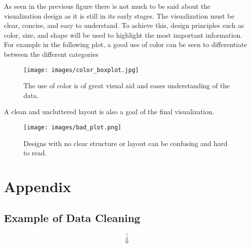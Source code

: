 \documentclass[12pt, a4paper]{article}
\begin{document}
\par As seen in the previous figure there is not much to be said about the visualization design as it is still in its early stages.
The visualization must be clear, concise, and easy to understand. To achieve this, design principles such as color, size, and shape will be used to highlight the most important information.
For example in the following plot, a good use of color can be seen to differentiate between the different categories
\begin{figure}[!h]
    \centering
    \texttt{[image: images/color\_boxplot.jpg]}
    \caption{The use of color is of great visual aid and eases understanding of the data.}
\end{figure}
\newpage
\par A clean and uncluttered layout is also a goal of the final visualization.

\begin{figure}[!h]
    \centering
    \texttt{[image: images/bad\_plot.png]}
    \caption{Designs with no clear structure or layout can be confusing and hard to read.}
\end{figure}



\clearpage



\nocite{*}

\newpage

\section*{Appendix}
\subsection*{Example of Data Cleaning}

\begin{table}[h]
    \centering
\end{table}
$$\vdots$$
$$\Downarrow$$
\end{document}
